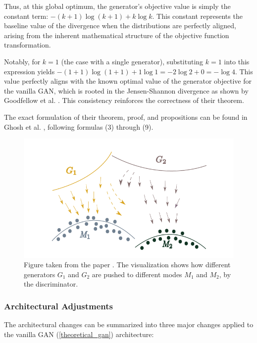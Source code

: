 Thus, at this global optimum, the generator's objective value is simply the constant term: \( -(k+1)\log(k+1) + k\log k \). This constant represents the baseline value of the divergence when the distributions are perfectly aligned, arising from the inherent mathematical structure of the objective function transformation.

Notably, for \(k=1\) (the case with a single generator), substituting \(k=1\) into this expression yields \( -(1+1)\log(1+1) + 1\log 1 = -2\log 2 + 0 = -\log 4 \). This value perfectly aligns with the known optimal value of the generator objective for the vanilla GAN, which is rooted in the Jensen-Shannon divergence as shown by Goodfellow et al. \cite{goodfellow2014generativeadversarialnetworks}. This consistency reinforces the correctness of their theorem.

The exact formulation of their theorem, proof, and propositions can be found in Ghosh et al. \cite{ghosh2018madgan}, following formulas (3) through (9).

\begin{figure}[htbp]
    \centering
    \includegraphics[width=.9\textwidth]{abb/madgan_diverse_mode_push.PNG}
    \caption{Figure taken from the paper \cite{ghosh2018madgan}. The visualization shows how different generators \(G_ {1}\) and \(G_{2}\) are pushed to different modes \(M_{1}\) and \(M_{2}\), by the discriminator.}
    \label{fig:figure_madgan_diverse_mode_push}
\end{figure}

\subsubsection{Architectural Adjustments}
\label{theory_madgan_architecture}
The architectural changes can be summarized into three major changes applied to the vanilla GAN (\ref{theoretical_gan}) architecture:

